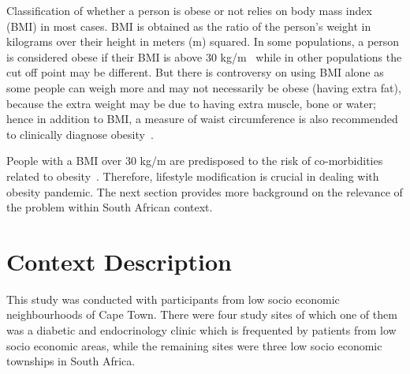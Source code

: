 Classification of whether a person is obese or not relies on body mass index (BMI) in most cases. BMI is obtained as the ratio of the person’s weight in kilograms over their height in meters (m) squared. In some populations, a person is considered obese if their BMI is above 30 kg/m~\citep{steyn2006chronic} while in other populations the cut off point may be different. But there is controversy on using BMI alone as some people can weigh more and may not necessarily be obese (having extra fat), because the extra weight may be due to having extra muscle, bone or water; hence in addition to BMI, a measure of waist circumference is also recommended to clinically diagnose obesity~\citep{janssen2004waist}. 

People with a BMI over 30 kg/m are predisposed to the risk of co-morbidities related to obesity~\citep{de2000clinical}. Therefore, lifestyle modification is crucial in dealing with obesity pandemic. The next section provides more background on the relevance of the problem within South African context.
\section{Context Description}
This study was conducted with participants from low socio economic neighbourhoods of Cape Town. There were four study sites of which one of them was a diabetic and endocrinology clinic which is frequented by patients from low socio economic areas, while the remaining sites were three low socio economic townships in South Africa. 

